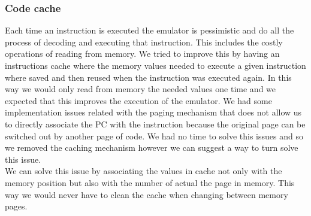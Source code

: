 \subsubsection{Code cache}
Each time an instruction is executed the emulator is pessimistic and do all the process of decoding and executing that instruction. This includes the costly operations of reading from memory. We tried to improve this by having an instructions cache where the memory values needed to execute a given instruction where saved and then reused when the instruction was executed again. In this way we would only read from memory the needed values one time and we expected that this improves the execution of the emulator. We had some implementation issues related with the paging mechanism that does not allow us to directly associate the PC with the instruction because the original page can be switched out by another page of code. We had no time to solve this issues and so we removed the caching mechanism however we can suggest a way to turn solve this issue.\\
\indent We can solve this issue by associating the values in cache not only with the memory position but also with the number of actual the page in memory. This way we would never have to clean the cache when changing between memory pages.